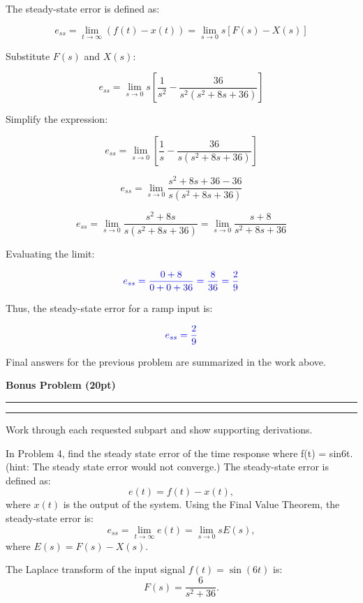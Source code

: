\documentclass[12pt]{article}
\newcommand{\question}[1]{%
  \clearpage
  \vspace{0.5cm}
  {\noindent\normalsize \textbf{#1}}
  \vspace{0.2cm}
  \hrule
  \vspace{0.1cm}
  \hrule
  \vspace{0.3cm}
}
\begin{document}
The steady-state error is defined as:

\[
	e_{ss} = \lim_{t \to \infty} (f(t) - x(t)) = \lim_{s \to 0} s \left[ F(s) - X(s) \right]
\]

Substitute \( F(s) \) and \( X(s) \):

\[
	e_{ss} = \lim_{s \to 0} s \left[ \frac{1}{s^2} - \frac{36}{s^2 (s^2 + 8s + 36)} \right]
\]

Simplify the expression:

\[
	e_{ss} = \lim_{s \to 0} \left[ \frac{1}{s} - \frac{36}{s (s^2 + 8s + 36)} \right]
\]

\[
	e_{ss} = \lim_{s \to 0} \frac{s^2 + 8s + 36 - 36}{s (s^2 + 8s + 36)}
\]

\[
	e_{ss} = \lim_{s \to 0} \frac{s^2 + 8s}{s (s^2 + 8s + 36)} = \lim_{s \to 0} \frac{s + 8}{s^2 + 8s + 36}
\]

Evaluating the limit:

\[
	\textcolor{blue}{e_{ss} = \frac{0 + 8}{0 + 0 + 36} = \frac{8}{36} = \frac{2}{9}}
\]

Thus, the steady-state error for a ramp input is:

\[
	\textcolor{blue}{e_{ss} = \frac{2}{9}}
\]

\newpage

\begin{resultsbox}
Final answers for the previous problem are summarized in the work above.
\end{resultsbox}

\question{Bonus Problem (20pt)}\label{quest:5}
\begin{stepbox}
Work through each requested subpart and show supporting derivations.
\end{stepbox}

In Problem 4, find the steady state error of the time response where f(t) = sin6t. (hint: The steady state error would not converge.)
\newline\newline
The steady-state error is defined as:
\begin{equation}
	e(t) = f(t) - x(t),
\end{equation}
where \( x(t) \) is the output of the system. Using the Final Value Theorem, the steady-state error is:
\begin{equation}
	e_{ss} = \lim_{t \to \infty} e(t) = \lim_{s \to 0} s E(s),
\end{equation}
where \( E(s) = F(s) - X(s) \).

The Laplace transform of the input signal \( f(t) = \sin(6t) \) is:
\begin{equation}
	F(s) = \frac{6}{s^2 + 36}.
\end{equation}
\end{document}
